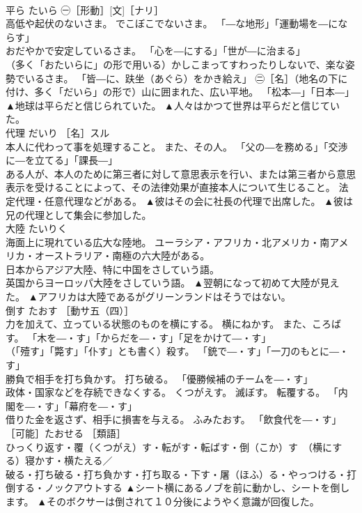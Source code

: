 \documentclass[8pt]{extreport}
\begin{document}
\begin{CJK}{UTF8}{min}
\\	平ら	たいら	㊀［形動］[文]［ナリ］ 
\\	高低や起伏のないさま。 でこぼこでないさま。 「―な地形」「運動場を―にならす」 
\\	おだやかで安定しているさま。 「心を―にする」「世が―に治まる」 
\\	（多く「おたいらに」の形で用いる）かしこまってすわったりしないで、楽な姿勢でいるさま。 「皆―に、趺坐（あぐら）をかき給え」 ㊁［名］（地名の下に付け、多く「だいら」の形で）山に囲まれた、広い平地。 「松本―」「日本―」	▲地球は平らだと信じられていた。 ▲人々はかつて世界は平らだと信じていた。
\\	代理	だいり	［名］スル 
\\	本人に代わって事を処理すること。 また、その人。 「父の―を務める」「交渉に―を立てる」「課長―」 
\\	ある人が、本人のために第三者に対して意思表示を行い、または第三者から意思表示を受けることによって、その法律効果が直接本人について生じること。 法定代理・任意代理などがある。	▲彼はその会に社長の代理で出席した。 ▲彼は兄の代理として集会に参加した。
\\	大陸	たいりく	
\\	海面上に現れている広大な陸地。 ユーラシア・アフリカ・北アメリカ・南アメリカ・オーストラリア・南極の六大陸がある。 
\\	日本からアジア大陸、特に中国をさしていう語。 
\\	英国からヨーロッパ大陸をさしていう語。	▲翌朝になって初めて大陸が見えた。 ▲アフリカは大陸であるがグリーンランドはそうではない。
\\	倒す	たおす	［動サ五（四）］ 
\\	力を加えて、立っている状態のものを横にする。 横にねかす。 また、ころばす。 「木を―・す」「からだを―・す」「足をかけて―・す」 
\\	（「殪す」「斃す」「仆す」とも書く）殺す。 「銃で―・す」「一刀のもとに―・す」 
\\	勝負で相手を打ち負かす。 打ち破る。 「優勝候補のチームを―・す」 
\\	政体・国家などを存続できなくする。 くつがえす。 滅ぼす。 転覆する。 「内閣を―・す」「幕府を―・す」 
\\	借りた金を返さず、相手に損害を与える。 ふみたおす。 「飲食代を―・す」 ［可能］たおせる ［類語］
\\	ひっくり返す・覆（くつがえ）す・転がす・転ばす・倒（こか）す　（横にする）寝かす・横たえる／
\\	破る・打ち破る・打ち負かす・打ち取る・下す・屠（ほふ）る・やっつける・打倒する・ノックアウトする	▲シート横にあるノブを前に動かし、シートを倒します。 ▲そのボクサーは倒されて１０分後にようやく意識が回復した。

\end{CJK}
\end{document}
